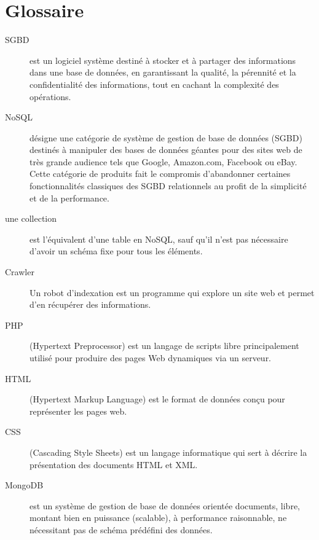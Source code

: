 \documentclass{report}
\begin{document}
\chapter{Glossaire}
\begin{description}
\item[SGBD] est un logiciel système destiné à stocker et à partager des informations dans une base de données, en garantissant la qualité, la pérennité et la confidentialité des informations, tout en cachant la complexité des opérations.
\item[NoSQL] désigne une catégorie de système de gestion de base de données (SGBD) destinés à manipuler des bases de données géantes pour des sites web de très grande audience tels que Google, Amazon.com, Facebook ou eBay. Cette catégorie de produits fait le compromis d'abandonner certaines fonctionnalités classiques des SGBD relationnels au profit de la simplicité et de la performance.
\item[une collection] est l'équivalent d'une table en NoSQL, sauf qu'il n'est pas nécessaire d'avoir un schéma fixe pour tous les éléments.
\item[Crawler] Un robot d'indexation est un programme qui explore un site web et permet d'en récupérer des informations.
\item[PHP] (Hypertext Preprocessor) est un langage de scripts libre principalement utilisé pour produire des pages Web dynamiques via un serveur.
\item[HTML] (Hypertext Markup Language) est le format de données conçu pour représenter les pages web.
\item[CSS] (Cascading Style Sheets) est un langage informatique qui sert à décrire la présentation des documents HTML et XML. 
\item[MongoDB] est un système de gestion de base de données orientée documents, libre, montant bien en puissance (scalable), à performance raisonnable, ne nécessitant pas de schéma prédéfini des données.

\end{description}
\end{document}
